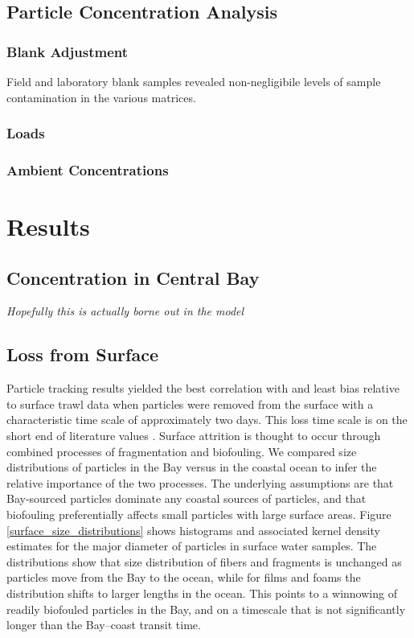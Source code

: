 \documentclass[draft]{jgr/agujournal2019}
\begin{document}
\subsection{Particle Concentration Analysis}



\subsubsection{Blank Adjustment}

Field and laboratory blank samples revealed non-negligibile levels
of sample contamination in the various matrices.

\subsubsection{Loads}

\subsubsection{Ambient Concentrations}

\section{Results}


\subsection{Concentration in Central Bay}

{\em Hopefully this is actually borne out in the model}


\subsection{Loss from Surface}

Particle tracking results yielded the best correlation with and least
bias relative to surface trawl data when particles were removed from
the surface with a characteristic time scale of approximately two
days.  This loss time scale is on the short end of literature values
. Surface attrition is thought to occur through
combined processes of fragmentation and biofouling.  We compared size
distributions of particles in the Bay versus in the coastal ocean to
infer the relative importance of the two processes.  The underlying
assumptions are that Bay-sourced particles dominate any coastal
sources of particles, and that biofouling preferentially affects small
particles with large surface areas.  Figure \ref{surface_size_distributions}
shows histograms and associated kernel density estimates for the
major diameter of particles in surface water samples. The distributions
show that size distribution of fibers and fragments is unchanged as particles
move from the Bay to the ocean, while for films and foams the 
distribution shifts to larger lengths in the ocean. This
points to a winnowing of readily biofouled particles in the Bay, and on
a timescale that is not significantly longer than the Bay--coast transit time.
\end{document}
